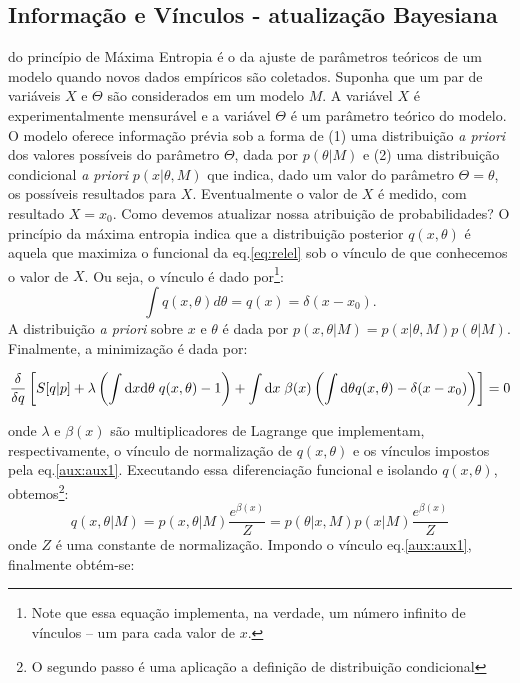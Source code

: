 \subsection{Informação e Vínculos - atualização Bayesiana}
\label{sec:bayes}
 do princípio de Máxima Entropia é o da ajuste de parâmetros teóricos de um modelo quando novos dados empíricos são coletados. Suponha que um par de variáveis $X$ e $\Theta$ são considerados em um modelo $M$. A variável $X$ é experimentalmente mensurável e a variável $\Theta$ é um parâmetro teórico do modelo. O modelo oferece informação prévia sob a forma de (1) uma distribuição \emph{a priori} dos valores possíveis do parâmetro $\Theta$, dada por $p(\theta | M)$ e (2) uma distribuição condicional \emph{a priori}  $p(x | \theta, M)$ que indica, dado um valor do parâmetro $\Theta = \theta$, os possíveis resultados para $X$. Eventualmente o valor de $X$ é medido, com resultado $X = x_0$. Como devemos atualizar nossa atribuição de probabilidades? O princípio da máxima entropia indica que a distribuição posterior $q(x,\theta)$ é aquela que maximiza o funcional da eq.\eqref{eq:relel} sob o vínculo de que conhecemos o valor de $X$. Ou seja, o vínculo é dado por\footnote{Note que essa equação implementa, na verdade, um número infinito de vínculos -- um para cada valor de $x$.}:
\begin{equation}
\label{aux:aux1}
 \int q(x, \theta) d\theta = q(x) = \delta(x-x_0).
\end{equation}
 A distribuição \emph{a priori} sobre $x$ e $\theta$ é dada por $p(x, \theta| M) = p(x|\theta, M) p(\theta| M)$. Finalmente, a minimização é dada por:
\begin{fullwidth}
\[
 \frac{\delta}{\delta q} \left[S[q | p] + \lambda \left(\int \mathrm{d} x\mathrm{d}\theta\; q(x,\theta) -1 \right) + \int \mathrm{d} x\; \beta(x) \left(\int\mathrm{d}\theta q(x,\theta) - \delta(x-x_0)\right)\right] =0
\]
\end{fullwidth}
onde $\lambda$ e $\beta(x)$ são multiplicadores de Lagrange que implementam, respectivamente, o vínculo de normalização de $q(x,\theta)$ e os vínculos impostos pela eq.\eqref{aux:aux1}. Executando essa diferenciação funcional e isolando $q(x,\theta)$, obtemos\footnote{O segundo passo é uma aplicação a definição de distribuição condicional}:
\begin{equation}
 q(x,\theta| M) = p(x,\theta| M)\frac{e^{\beta(x)}}{Z} = p(\theta|x, M)p(x |M)\frac{e^{\beta(x)}}{Z}
\end{equation}
onde $Z$ é uma constante de normalização. Impondo o vínculo eq.\eqref{aux:aux1}, finalmente obtém-se:
